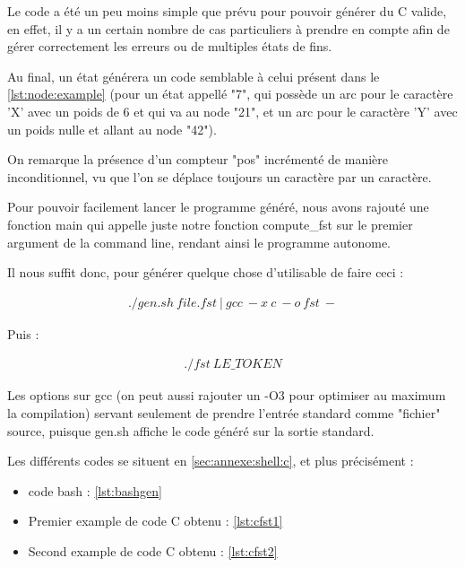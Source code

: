 Le code a été un peu moins simple que prévu pour pouvoir générer du C valide, en effet, il y a un
certain nombre de cas particuliers à prendre en compte afin de gérer correctement les erreurs ou
de multiples états de fins.



Au final, un état générera un code semblable à celui présent dans le \autoref{lst:node:example}
(pour un état appellé "7", qui possède
un arc pour le caractère 'X' avec un poids de 6 et qui va au node "21", et un arc pour
le caractère 'Y' avec un poids nulle et allant au node "42").
\begin{figure}
    
\end{figure}

On remarque la présence d'un compteur "pos" incrémenté de manière inconditionnel, vu que l'on se
déplace toujours un caractère par un caractère.

Pour pouvoir facilement lancer le programme généré, nous avons rajouté une fonction main qui appelle
juste notre fonction compute\_fst sur le premier argument de la command line,
rendant ainsi le programme autonome.

Il nous suffit donc, pour générer quelque chose d'utilisable de faire ceci :

\begin{align*}
    ./gen.sh\ file.fst\ |\ gcc\ -x\ c\ -o\ fst\ -
\end{align*}

Puis :

\begin{align*}
./fst\ LE\_TOKEN
\end{align*}

Les options sur gcc (on peut aussi rajouter un -O3 pour optimiser au maximum la compilation)
servant seulement de prendre l'entrée standard comme "fichier" source, puisque gen.sh affiche
le code généré sur la sortie standard.\newline


Les différents codes se situent en \autoref{sec:annexe:shell:c}, et plus précisément :
\begin{itemize}
    \item code bash : \autoref{lst:bashgen}
    \item Premier example de code C obtenu : \autoref{lst:cfst1}
    \item Second example de code C obtenu : \autoref{lst:cfst2}
\end{itemize}

